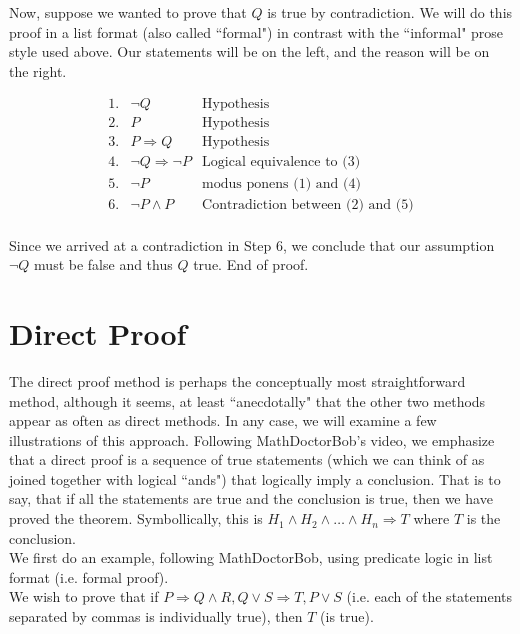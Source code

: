 Now, suppose we wanted to prove that $Q$ is true by contradiction.  We will do this proof in a list format (also called ``formal") in contrast with the ``informal" prose style used above.  Our statements will be on the left, and the reason will be on the right.

\begin{displaymath}
\begin{matrix}
1. & \neg Q & \text{Hypothesis} \\
2. & P & \text{Hypothesis} \\
3. & P \Longrightarrow Q & \text{Hypothesis} \\
4. &  \neg Q \Longrightarrow \neg P & \text{Logical equivalence to (3)} \\
5. & \neg P & \text{modus ponens (1) and (4)} \\
6. & \neg P \land P & \text{Contradiction between (2) and (5)} \\
\end{matrix}
\end{displaymath}

Since we arrived at a contradiction in Step 6, we conclude that our assumption $\neg Q$ must be false and thus $Q$ true.  End of proof.

\section{Direct Proof}

The direct proof method is perhaps the conceptually most straightforward method, although it seems, at least ``anecdotally" that the other two methods appear as often as direct methods.  In any case, we will examine a few illustrations of this approach.  Following MathDoctorBob's video, we emphasize that a direct proof is a sequence of true statements (which we can think of as joined together with logical ``ands") that logically imply a conclusion.  That is to say, that if all the statements are true and the conclusion is true, then we have proved the theorem.  Symbollically, this is $H_{1} \land H_{2} \land \ldots \land H_{n} \Longrightarrow T$ where $T$ is the conclusion.\\

We first do an example, following MathDoctorBob, using predicate logic in list format (i.e. formal proof).\\

We wish to prove that if $P \Longrightarrow Q \land R, Q \lor S \Longrightarrow T, P \lor S$ (i.e. each of the statements separated by commas is individually true), then $T$ (is true).


